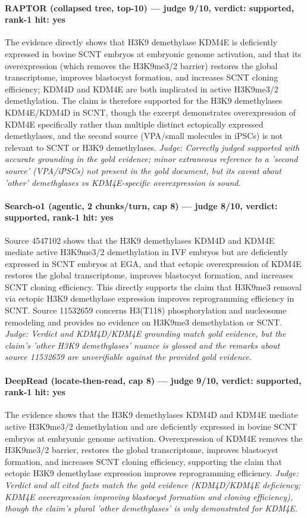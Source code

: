 \documentclass[sigconf, review, anonymous]{acmart}
\begin{document}
\paragraph{RAPTOR (collapsed tree, top-10) --- judge 9/10, verdict: supported, rank-1 hit: yes}
\noindent The evidence directly shows that H3K9 demethylase KDM4E is deficiently expressed in bovine SCNT embryos at embryonic genome activation, and that its overexpression (which removes the H3K9me3/2 barrier) restores the global transcriptome, improves blastocyst formation, and increases SCNT cloning efficiency; KDM4D and KDM4E are both implicated in active H3K9me3/2 demethylation. The claim is therefore supported for the H3K9 demethylases KDM4E/KDM4D in SCNT, though the excerpt demonstrates overexpression of KDM4E specifically rather than multiple distinct ectopically expressed demethylases, and the second source (VPA/small molecules in iPSCs) is not relevant to SCNT or H3K9 demethylases.
\noindent\small\textit{Judge: Correctly judged supported with accurate grounding in the gold evidence; minor extraneous reference to a 'second source' (VPA/iPSCs) not present in the gold document, but its caveat about 'other' demethylases vs KDM4E-specific overexpression is sound.}
\paragraph{Search-o1 (agentic, 2 chunks/turn, cap 8) --- judge 8/10, verdict: supported, rank-1 hit: yes}
\noindent Source 4547102 shows that the H3K9 demethylases KDM4D and KDM4E mediate active H3K9me3/2 demethylation in IVF embryos but are deficiently expressed in SCNT embryos at EGA, and that ectopic overexpression of KDM4E restores the global transcriptome, improves blastocyst formation, and increases SCNT cloning efficiency. This directly supports the claim that H3K9me3 removal via ectopic H3K9 demethylase expression improves reprogramming efficiency in SCNT. Source 11532659 concerns H3(T118) phosphorylation and nucleosome remodeling and provides no evidence on H3K9me3 demethylation or SCNT.
\noindent\small\textit{Judge: Verdict and KDM4D/KDM4E grounding match gold evidence, but the claim's 'other H3K9 demethylases' nuance is glossed and the remarks about source 11532659 are unverifiable against the provided gold evidence.}
\paragraph{DeepRead (locate-then-read, cap 8) --- judge 9/10, verdict: supported, rank-1 hit: yes}
\noindent The evidence shows that the H3K9 demethylases KDM4D and KDM4E mediate active H3K9me3/2 demethylation and are deficiently expressed in bovine SCNT embryos at embryonic genome activation. Overexpression of KDM4E removes the H3K9me3/2 barrier, restores the global transcriptome, improves blastocyst formation, and increases SCNT cloning efficiency, supporting the claim that ectopic H3K9 demethylase expression improves reprogramming efficiency.
\noindent\small\textit{Judge: Verdict and all cited facts match the gold evidence (KDM4D/KDM4E deficiency; KDM4E overexpression improving blastocyst formation and cloning efficiency), though the claim's plural 'other demethylases' is only demonstrated for KDM4E.}
\end{document}
